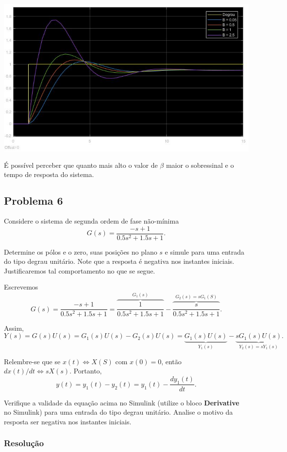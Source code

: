 \documentclass[
]{book}
\begin{document}
\includegraphics{Imagens/Lab2/prob5SimResult.jpg}

É possível perceber que quanto mais alto o valor de \(\beta\) maior o sobressinal e o tempo de resposta do sistema.

\hypertarget{problema-6}{%
\subsection*{Problema 6}\label{problema-6}}

Considere o sistema de segunda ordem de fase não-mínima
\[
G(s) = \frac {-s+1}{0.5s^2+1.5s+1}.
\]

Determine os pólos e o zero, suas posições no plano \(s\) e simule para uma entrada do tipo degrau unitário. Note que a resposta é negativa nos instantes iniciais. Justificaremos tal comportamento no que se segue.

Escrevemos
\[
G(s) = \frac {-s+1}{0.5s^2+1.5s+1} = \overbrace{\frac {1}{0.5s^2+1.5s+1}}^{G_1(s)} - \overbrace{\frac {s}{0.5s^2+1.5s+1}}^{G_2(s) = sG_1(S)}.
\]

Assim,
\[
Y(s) = G(s)U(s) = G_1(s)U(s)-G_2(s)U(s) = \underbrace{G_1(s)U(s)}_{Y_1(s)} - \underbrace{sG_1(s)U(s)}_{Y_2(s) = sY_1(s)}.
\]

Relembre-se que se \(x(t) \iff X(S)\) com \(x(0) = 0\), então \(dx(t)/dt \iff sX(s)\). Portanto,
\[
y(t) = y_1(t)-y_2(t)=y_1(t)- \frac {dy_1(t)}{dt}.
\]

Verifique a validade da equação acima no Simulink (utilize o bloco \textbf{Derivative} no Simulink) para uma entrada do tipo degrau unitário. Analise o motivo da resposta ser negativa nos instantes iniciais.

\hypertarget{resoluuxe7uxe3o-5}{%
\subsubsection*{Resolução}\label{resoluuxe7uxe3o-5}}
\end{document}
